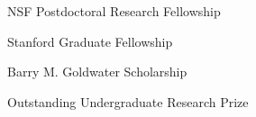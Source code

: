 

\begin{cvhonors}


\cvhonor
{NSF Postdoctoral Research Fellowship}
{}
{}
{}

\cvhonor
{Stanford Graduate Fellowship}
{}
{}
{}

\cvhonor
{Barry M. Goldwater Scholarship}
{}
{}
{}

\cvhonor
{Outstanding Undergraduate Research Prize}
{}
{}
{}


\end{cvhonors}

